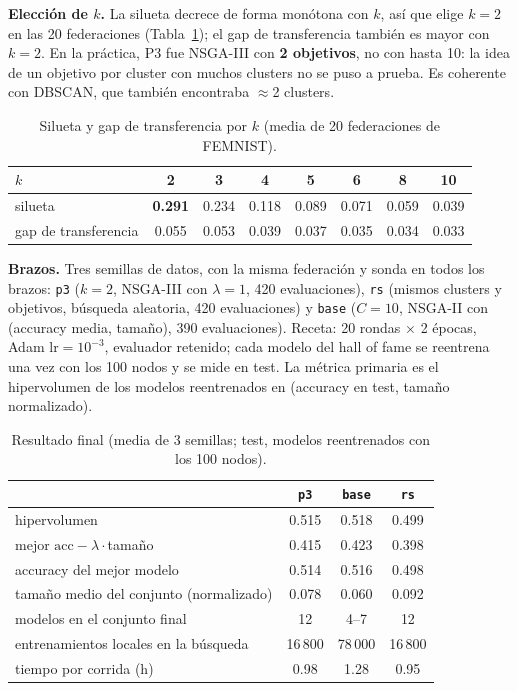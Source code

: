 \documentclass[11pt,a4paper]{article}
\newcommand{\acc}{\mathrm{acc}}
\begin{document}
\textbf{Elección de $k$.} La silueta decrece de forma monótona con $k$, así que elige $k=2$ en las 20 federaciones (Tabla~\ref{tab:k}); el gap de transferencia también es mayor con $k=2$. En la práctica, P3 fue NSGA-III con \textbf{2 objetivos}, no con hasta 10: la idea de un objetivo por cluster con muchos clusters no se puso a prueba. Es coherente con DBSCAN, que también encontraba $\approx$2 clusters.

\begin{table}[h]
\centering\small
\begin{tabular}{lccccccc}
\toprule
$k$ & 2 & 3 & 4 & 5 & 6 & 8 & 10\\
\midrule
silueta & \textbf{0.291} & 0.234 & 0.118 & 0.089 & 0.071 & 0.059 & 0.039\\
gap de transferencia & 0.055 & 0.053 & 0.039 & 0.037 & 0.035 & 0.034 & 0.033\\
\bottomrule
\end{tabular}
\caption{Silueta y gap de transferencia por $k$ (media de 20 federaciones de FEMNIST).}
\label{tab:k}
\end{table}

\textbf{Brazos.} Tres semillas de datos, con la misma federación y sonda en todos los brazos: \texttt{p3} ($k=2$, NSGA-III con $\lambda=1$, 420 evaluaciones), \texttt{rs} (mismos clusters y objetivos, búsqueda aleatoria, 420 evaluaciones) y \texttt{base} ($C=10$, NSGA-II con (accuracy media, tamaño), 390 evaluaciones). Receta: 20 rondas $\times$ 2 épocas, Adam $\mathrm{lr}=10^{-3}$, evaluador retenido; cada modelo del hall of fame se reentrena una vez con los 100 nodos y se mide en test. La métrica primaria es el hipervolumen de los modelos reentrenados en (accuracy en test, tamaño normalizado).

\begin{table}[h]
\centering\small
\begin{tabular}{lccc}
\toprule
 & \texttt{p3} & \texttt{base} & \texttt{rs}\\
\midrule
hipervolumen & 0.515 & 0.518 & 0.499\\
mejor $\acc-\lambda\cdot$tamaño & 0.415 & 0.423 & 0.398\\
accuracy del mejor modelo & 0.514 & 0.516 & 0.498\\
tamaño medio del conjunto (normalizado) & 0.078 & 0.060 & 0.092\\
modelos en el conjunto final & 12 & 4--7 & 12\\
entrenamientos locales en la búsqueda & 16\,800 & 78\,000 & 16\,800\\
tiempo por corrida (h) & 0.98 & 1.28 & 0.95\\
\bottomrule
\end{tabular}
\caption{Resultado final (media de 3 semillas; test, modelos reentrenados con los 100 nodos).}
\label{tab:p3}
\end{table}
\end{document}
